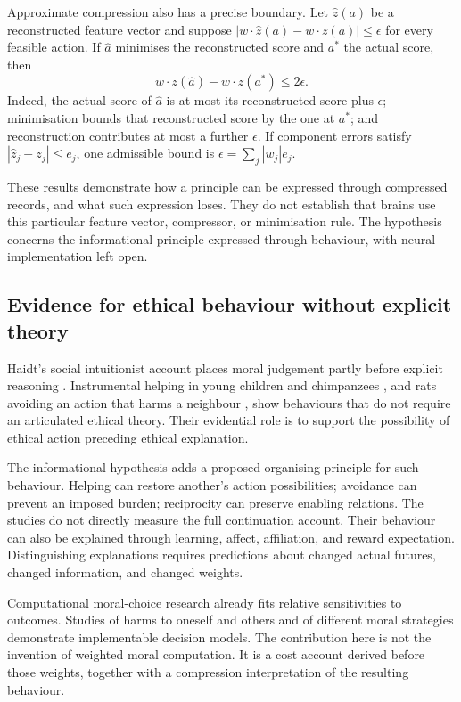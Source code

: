 \documentclass[11pt,a4paper]{article}
\theoremstyle{remark}
\begin{document}
Approximate compression also has a precise boundary. Let $\widehat z(a)$ be a
reconstructed feature vector and suppose
$|w\cdot\widehat z(a)-w\cdot z(a)|\leq\epsilon$ for every feasible action.
If $\widehat a$ minimises the reconstructed score and $a^*$ the actual score,
then
\begin{equation}\label{eq:regret}
w\cdot z(\widehat a)-w\cdot z(a^*)\leq2\epsilon.
\end{equation}
Indeed, the actual score of $\widehat a$ is at most its reconstructed score plus
$\epsilon$; minimisation bounds that reconstructed score by the one at $a^*$;
and reconstruction contributes at most a further $\epsilon$. If component errors
satisfy $|\widehat z_j-z_j|\leq e_j$, one admissible bound is
$\epsilon=\sum_j|w_j|e_j$.

These results demonstrate how a principle can be expressed through compressed
records, and what such expression loses. They do not establish that brains use
this particular feature vector, compressor, or minimisation rule. The hypothesis
concerns the informational principle expressed through behaviour, with neural
implementation left open.

\subsection{Evidence for ethical behaviour without explicit theory}

Haidt's social intuitionist account places moral judgement partly before explicit
reasoning \citep{haidt2001intuition}. Instrumental helping in young children and
chimpanzees \citep{warnekentomasello2006helping}, and rats avoiding an action that
harms a neighbour \citep{hernandezlallement2020harm}, show behaviours that do not
require an articulated ethical theory. Their evidential role is to support the
possibility of ethical action preceding ethical explanation.

The informational hypothesis adds a proposed organising principle for such
behaviour. Helping can restore another's action possibilities; avoidance can
prevent an imposed burden; reciprocity can preserve enabling relations. The
studies do not directly measure the full continuation account. Their behaviour
can also be explained through learning, affect, affiliation, and reward
expectation. Distinguishing explanations requires predictions about changed
actual futures, changed information, and changed weights.

Computational moral-choice research already fits relative sensitivities to
outcomes. Studies of harms to oneself and others
\citep{crockett2014harm} and of different moral strategies
\citep{vanbaar2019moralstrategies} demonstrate implementable decision models.
The contribution here is not the invention of weighted moral computation. It
is a cost account derived before those weights, together with a compression
interpretation of the resulting behaviour.
\end{document}
